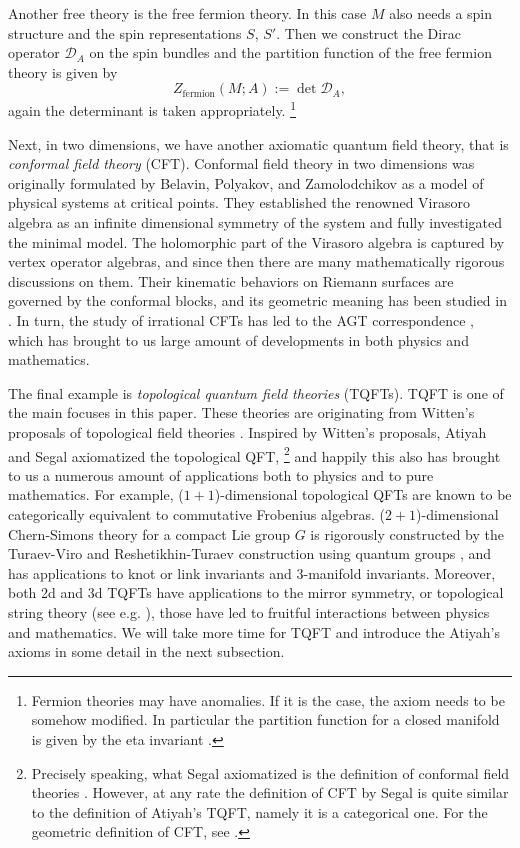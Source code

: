 Another free theory is the free fermion theory. In this case $M$
also needs a spin structure and the spin representations $S$, $S'$.
Then we construct the Dirac operator $\mathcal{D}_{A}$ on the spin
bundles and the partition function of the free fermion theory is given
by 
\begin{equation}
Z_{\mathrm{fermion}}\left(M;A\right):=\det\mathcal{D}_{A},
\end{equation}
 again the determinant is taken appropriately.%
%
\footnote{Fermion theories may have anomalies. If it is the case, the axiom
needs to be somehow modified. In particular the partition function
for a closed manifold is given by the eta invariant \cite{Dai:1994kq}. }

Next, in two dimensions, we have another axiomatic quantum field theory,
that is \emph{conformal field theory} (CFT). Conformal field theory
in two dimensions was originally formulated by Belavin, Polyakov,
and Zamolodchikov \cite{Belavin:1984vu} as a model of physical systems at critical
points. They established the renowned Virasoro algebra as an infinite
dimensional symmetry of the system and fully investigated the minimal
model. The holomorphic part of the Virasoro algebra is captured by
vertex operator algebras, and since then there are many mathematically
rigorous discussions on them. Their kinematic behaviors on Riemann
surfaces are governed by the conformal blocks, and its geometric meaning
has been studied in \cite{Friedan:1986ua}. In turn, the study of irrational
CFTs has led to the AGT correspondence \cite{Alday:2009aq}, which has brought
to us large amount of developments in both physics and mathematics. 

The final example is \emph{topological quantum field theories} (TQFTs).
TQFT is one of the main focuses in this paper. These theories are
originating from Witten's proposals of topological field theories
\cite{Witten:1988xj, Witten:1988ze, Witten:1988hf}. Inspired by Witten's
proposals, Atiyah and Segal axiomatized the topological QFT,%
%
\footnote{Precisely speaking, what Segal axiomatized is the definition of conformal
field theories \cite{Segal:2002ei}. However, at any rate the definition of CFT by Segal
is quite similar to the definition of Atiyah's TQFT, namely it is a
categorical one. For the geometric definition of CFT, see \cite{Friedan:1986ua}. }
%
 and happily this also has brought to us a numerous amount of applications
both to physics and to pure mathematics. For example, ($1+1$)-dimensional
topological QFTs are known to be categorically equivalent to commutative
Frobenius algebras. ($2+1$)-dimensional Chern-Simons theory for a
compact Lie group $G$ is rigorously constructed by the Turaev-Viro
and Reshetikhin-Turaev construction using quantum groups \cite{Turaev:1992hq, Reshetikhin:1991tc}, and has
applications to knot or link invariants and $3$-manifold invariants.
Moreover, both 2d and 3d TQFTs have applications to the mirror symmetry,
or topological string theory (see e.g. \cite{Hori:2003ic}), those have led to fruitful interactions
between physics and mathematics. We will take more time for TQFT and
introduce the Atiyah's axioms in some detail in the next subsection. 


